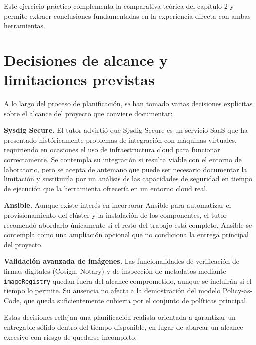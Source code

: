 Este ejercicio práctico complementa la comparativa teórica del capítulo 2 y permite extraer conclusiones fundamentadas en la experiencia directa con ambas herramientas.

\section{Decisiones de alcance y limitaciones previstas}

A lo largo del proceso de planificación, se han tomado varias decisiones explícitas sobre el alcance del proyecto que conviene documentar:

\textbf{Sysdig Secure.} El tutor advirtió que Sysdig Secure es un servicio SaaS que ha presentado históricamente problemas de integración con máquinas virtuales, requiriendo en ocasiones el uso de infraestructura cloud para funcionar correctamente. Se contempla su integración si resulta viable con el entorno de laboratorio, pero se acepta de antemano que puede ser necesario documentar la limitación y sustituirla por un análisis de las capacidades de seguridad en tiempo de ejecución que la herramienta ofrecería en un entorno cloud real.

\textbf{Ansible.} Aunque existe interés en incorporar Ansible para automatizar el provisionamiento del clúster y la instalación de los componentes, el tutor recomendó abordarlo únicamente si el resto del trabajo está completo. Ansible se contempla como una ampliación opcional que no condiciona la entrega principal del proyecto.

\textbf{Validación avanzada de imágenes.} Las funcionalidades de verificación de firmas digitales (Cosign, Notary) y de inspección de metadatos mediante \texttt{imageRegistry} quedan fuera del alcance comprometido, aunque se incluirán si el tiempo lo permite. Su ausencia no afecta a la demostración del modelo Policy-as-Code, que queda suficientemente cubierta por el conjunto de políticas principal.

Estas decisiones reflejan una planificación realista orientada a garantizar un entregable sólido dentro del tiempo disponible, en lugar de abarcar un alcance excesivo con riesgo de quedarse incompleto.
